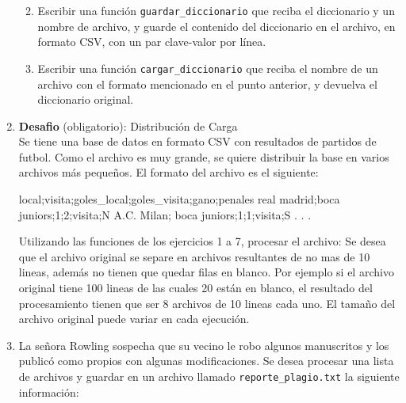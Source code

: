 \documentclass[
  letterpaper,
  DIV=11,
  numbers=noendperiod]{scrreprt}
\newenvironment{Shaded}{\begin{snugshade}}{\end{snugshade}}
\newcommand{\BuiltInTok}[1]{\textcolor[rgb]{0.00,0.23,0.31}{#1}}
\newcommand{\ExtensionTok}[1]{\textcolor[rgb]{0.00,0.23,0.31}{#1}}
\newcommand{\KeywordTok}[1]{\textcolor[rgb]{0.00,0.23,0.31}{#1}}
\newcommand{\NormalTok}[1]{\textcolor[rgb]{0.00,0.23,0.31}{#1}}
\providecommand{\tightlist}{%
  \setlength{\itemsep}{0pt}\setlength{\parskip}{0pt}}\usepackage{longtable,booktabs,array}
\begin{document}
\begin{enumerate}
  \begin{enumerate}
  \def\labelenumii{\alph{enumii}.}
  \tightlist
  \item
    Escribir una función \texttt{guardar\_diccionario} que reciba el
    diccionario y un nombre de archivo, y guarde el contenido del
    diccionario en el archivo, en formato CSV, con un par clave-valor
    por línea.
  \item
    Escribir una función \texttt{cargar\_diccionario} que reciba el
    nombre de un archivo con el formato mencionado en el punto anterior,
    y devuelva el diccionario original.
  \end{enumerate}
\item
  \textbf{Desafio} (obligatorio): Distribución de Carga\\
  Se tiene una base de datos en formato CSV con resultados de partidos
  de futbol. Como el archivo es muy grande, se quiere distribuir la base
  en varios archivos más pequeños. El formato del archivo es el
  siguiente:

\begin{Shaded}
\begin{Highlighting}[]
\BuiltInTok{local}\KeywordTok{;}\ExtensionTok{visita}\KeywordTok{;}\ExtensionTok{goles\_local}\KeywordTok{;}\ExtensionTok{goles\_visita}\KeywordTok{;}\ExtensionTok{gano}\KeywordTok{;}\ExtensionTok{penales}
\ExtensionTok{real}\NormalTok{ madrid}\KeywordTok{;}\ExtensionTok{boca}\NormalTok{ juniors}\KeywordTok{;}\ExtensionTok{1}\KeywordTok{;}\ExtensionTok{2}\KeywordTok{;}\ExtensionTok{visita}\KeywordTok{;}\ExtensionTok{N}
\ExtensionTok{A.C.}\NormalTok{ Milan}\KeywordTok{;} \ExtensionTok{boca}\NormalTok{ juniors}\KeywordTok{;}\ExtensionTok{1}\KeywordTok{;}\ExtensionTok{1}\KeywordTok{;}\ExtensionTok{visita}\KeywordTok{;}\ExtensionTok{S}
\BuiltInTok{.}
\BuiltInTok{.}
\BuiltInTok{.}
\end{Highlighting}
\end{Shaded}

  Utilizando las funciones de los ejercicios 1 a 7, procesar el archivo:
  Se desea que el archivo original se separe en archivos resultantes de
  no mas de 10 lineas, además no tienen que quedar filas en blanco. Por
  ejemplo si el archivo original tiene 100 lineas de las cuales 20 están
  en blanco, el resultado del procesamiento tienen que ser 8 archivos de
  10 lineas cada uno. El tamaño del archivo original puede variar en
  cada ejecución.
\item
  La señora Rowling sospecha que su vecino le robo algunos manuscritos y
  los publicó como propios con algunas modificaciones. Se desea procesar
  una lista de archivos y guardar en un archivo llamado
  \texttt{reporte\_plagio.txt} la siguiente información:


\end{enumerate}
\end{document}
